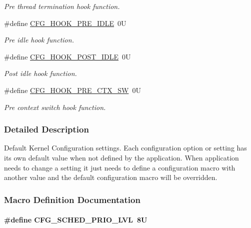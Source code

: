 \begin{DoxyCompactItemize}
\begin{DoxyCompactList}\small\item\em Pre thread termination hook function. \end{DoxyCompactList}\item 
\#define \hyperlink{group__template__kern__cfg_ga7c2b0410404256c4804758090401f7e4}{C\-F\-G\-\_\-\-H\-O\-O\-K\-\_\-\-P\-R\-E\-\_\-\-I\-D\-L\-E}~0\-U
\begin{DoxyCompactList}\small\item\em Pre idle hook function. \end{DoxyCompactList}\item 
\#define \hyperlink{group__template__kern__cfg_ga8f8751efe94964bef25673deca6b9b26}{C\-F\-G\-\_\-\-H\-O\-O\-K\-\_\-\-P\-O\-S\-T\-\_\-\-I\-D\-L\-E}~0\-U
\begin{DoxyCompactList}\small\item\em Post idle hook function. \end{DoxyCompactList}\item 
\#define \hyperlink{group__template__kern__cfg_gac84acbf84222018398089920dd429635}{C\-F\-G\-\_\-\-H\-O\-O\-K\-\_\-\-P\-R\-E\-\_\-\-C\-T\-X\-\_\-\-S\-W}~0\-U
\begin{DoxyCompactList}\small\item\em Pre context switch hook function. \end{DoxyCompactList}\end{DoxyCompactItemize}


\subsubsection{Detailed Description}
Default Kernel Configuration settings. Each configuration option or setting has its own default value when not defined by the application. When application needs to change a setting it just needs to define a configuration macro with another value and the default configuration macro will be overridden. 

\subsubsection{Macro Definition Documentation}
\hypertarget{group__template__kern__cfg_ga56bd89fe76f7fe22f3d8805bc3c68892}{
\paragraph[{C\-F\-G\-\_\-\-S\-C\-H\-E\-D\-\_\-\-P\-R\-I\-O\-\_\-\-L\-V\-L}]{\setlength{\rightskip}{0pt plus 5cm}\#define C\-F\-G\-\_\-\-S\-C\-H\-E\-D\-\_\-\-P\-R\-I\-O\-\_\-\-L\-V\-L~8\-U}}\label{group__template__kern__cfg_ga56bd89fe76f7fe22f3d8805bc3c68892}


